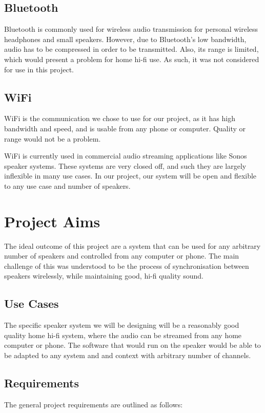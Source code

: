 \documentclass[main.tex]{subfiles}
\begin{document}
\subsection{Bluetooth}
Bluetooth is commonly used for wireless audio transmission for personal wireless headphones and small speakers.
However, due to Bluetooth's low bandwidth, audio has to be compressed in order to be transmitted.
Also, its range is limited, which would present a problem for home hi-fi use.
As such, it was not considered for use in this project.
\subsection{WiFi}
WiFi is the communication we chose to use for our project, as it has high bandwidth and speed, and is usable from any phone or computer.
Quality or range would not be a problem.

WiFi is currently used in commercial audio streaming applications like Sonos speaker systems.
These systems are very closed off, and such they are largely inflexible in many use cases.
In our project, our system will be open and flexible to any use case and number of speakers.

\section{Project Aims}
The ideal outcome of this project are a system that can be used for any arbitrary number of speakers and controlled from any computer or phone.
The main challenge of this was understood to be the process of synchronisation between speakers wirelessly, while maintaining good, hi-fi quality sound.

\subsection{Use Cases}
The specific speaker system we will be designing will be a reasonably good quality home hi-fi system, where the audio can be streamed from any home computer or phone.
The software that would run on the speaker would be able to be adapted to any system and and context with arbitrary number of channels.
\subsection{Requirements}
The general project requirements are outlined as follows:
\end{document}
